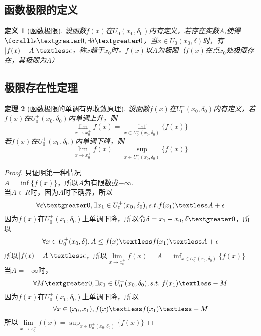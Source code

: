\documentclass[12pt, a4paper, oneside]{ctexart}
\newtheorem{theorem}{定理}[section]
\newtheorem{definition}[theorem]{定义}
\begin{document}
\subsection{函数极限的定义}

\begin{definition}[函数极限]
设函数$f(x)$在$U_{0}(x_0,\delta_0)$内有定义，若存在实数$A$,使得$\foralll \epsilon \textgreater 0,\exists \delta \textgreater 0$，当$x\in U_0(x_0,\delta)$时，有$|f(x)-A|\textless \epsilon$，称$x$趋于$x_0$时，$f(x)$以$A$为极限（$f(x)$在点$x_0$处极限存在，其极限为$A$）
\end{definition}

\subsection{极限存在性定理}

\begin{theorem}[函数极限的单调有界收敛原理]
设函数$f(x)$在$U_{0}^{+}(x_0,\delta_0)$内有定义，若$f(x)$在$U_{0}^{+}(x_0,\delta_0)$内单调上升，则
\begin{equation*}
    \lim\limits_{x\to x_{0}^{+}}f(x)=\inf_{x \in U_{0}^{+}(x_0,\delta_0)}\{f(x)\}
\end{equation*}
若$f(x)$在$U_{0}^{+}(x_0,\delta_0)$内单调下降，则
\begin{equation*}
    \lim\limits_{x\to x_{0}^{+}}f(x)=\sup_{x \in U_{0}^{+}(x_0,\delta_0)}\{f(x)\}
\end{equation*}
\end{theorem}

\begin{proof}
只证明第一种情况\\
$A=\inf\{f(x)\}$，所以$A$为有限数或$-\infty $.\\
当$A\in R$时，因为$A$时下确界，所以$$\forall \epsilon \textgreater 0,\exists x_1 \in U_{0}^{+}(x_0,\delta_0),s.t.f(x_1)\textless A+\epsilon$$因为$f(x)$在$U_{0}^{+}(x_0,\delta_0)$上单调下降，所以令$\delta=x_1-x_0,\delta \textgreater 0$，所以$$\forall x\in U_{0}^{+}(x_0,\delta),A \leq f(x)\textless f(x_1)\textless A+\epsilon$$所以$|f(x)-A|\textless \epsilon$，所以$\lim\limits_{x\to x_{0}^{+}}f(x)=A=\inf_{x \in U_{0}^{+}(x_0,\delta_0)}\{f(x)\}$\\
当$A=-\infty$时，$$\forall M \textgreater 0,\exists x_1 \in U_{0}^{+}(x_0,\delta_0),s.t.\;f(x_1)\textless -M $$因为$f(x)$在$U_{0}^{+}(x_0,\delta_0)$上单调下降，所以$$\forall x \in (x_0,x_1),f(x)\textless f(x_1)\textless -M$$所以$\lim\limits_{x\to x_{0}^{+}}f(x)=\sup_{x \in U_{0}^{+}(x_0,\delta_0)}\{f(x)\}$
\end{proof}
\end{document}
